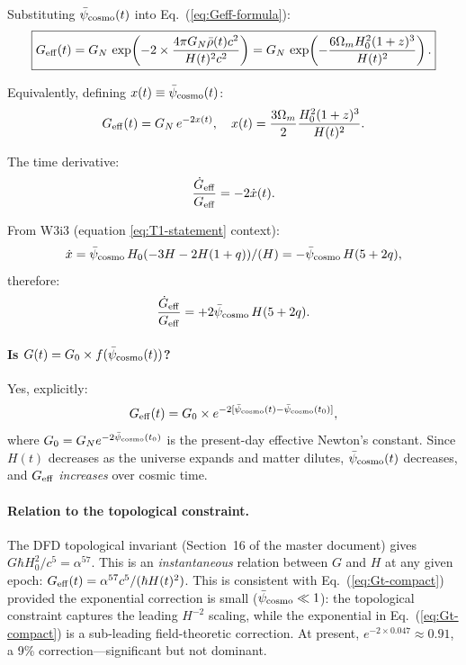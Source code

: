 \documentclass[11pt]{article}
\newcommand{\psicosmo}{\bar{\psi}_{\rm cosmo}}
\begin{document}
Substituting $\psicosmo(t)$ into Eq.~(\ref{eq:Geff-formula}):
\begin{equation}
\boxed{G_{\rm eff}(t) = G_N\,\exp\!\left(-2\times\frac{4\pi G_N\bar{\rho}(t)c^2}{H(t)^2 c^2}\right)
= G_N\,\exp\!\left(-\frac{6\Omega_m H_0^2(1+z)^3}{H(t)^2}\right).}
\label{eq:Gt-explicit}
\end{equation}

Equivalently, defining $x(t) \equiv \psicosmo(t)$:
\begin{equation}
G_{\rm eff}(t) = G_N\,e^{-2x(t)}, \quad x(t) = \frac{3\Omega_m}{2}\frac{H_0^2(1+z)^3}{H(t)^2}.
\label{eq:Gt-compact}
\end{equation}

The time derivative:
\begin{equation}
\frac{\dot{G}_{\rm eff}}{G_{\rm eff}} = -2\dot{x}(t).
\label{eq:Gdot-def}
\end{equation}

From W3i3 (equation \ref{eq:T1-statement} context):
\begin{equation}
\dot{x} = \psicosmo\,H_0(-3H - 2H(1+q))/(H) = -\psicosmo\,H(5+2q),
\end{equation}
therefore:
\begin{equation}
\frac{\dot{G}_{\rm eff}}{G_{\rm eff}} = +2\psicosmo\,H(5+2q).
\label{eq:Gdot-formula}
\end{equation}

\paragraph{Is $G(t) = G_0 \times f(\psicosmo(t))$?} Yes, explicitly:
\begin{equation}
G_{\rm eff}(t) = G_0 \times e^{-2[\psicosmo(t) - \psicosmo(t_0)]},
\label{eq:G-ratio}
\end{equation}
where $G_0 = G_N e^{-2\psicosmo(t_0)}$ is the present-day effective Newton's constant.
Since $H(t)$ decreases as the universe expands and matter dilutes, $\psicosmo(t)$
decreases, and $G_{\rm eff}$ \emph{increases} over cosmic time.

\paragraph{Relation to the topological constraint.} The DFD topological invariant
(Section~16 of the master document) gives $G\hbar H_0^2/c^5 = \alpha^{57}$.
This is an \emph{instantaneous} relation between $G$ and $H$ at any given epoch:
$G_{\rm eff}(t) = \alpha^{57}c^5/(\hbar H(t)^2)$. This is consistent with
Eq.~(\ref{eq:Gt-compact}) provided the exponential correction is small
($\psicosmo \ll 1$): the topological constraint captures the leading $H^{-2}$
scaling, while the exponential in Eq.~(\ref{eq:Gt-compact}) is a sub-leading
field-theoretic correction. At present, $e^{-2\times 0.047} \approx 0.91$,
a 9\% correction---significant but not dominant.
\end{document}
